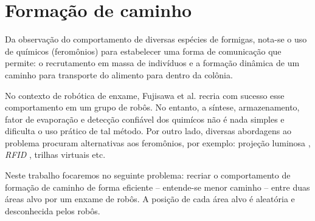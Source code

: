 \section{Formação de caminho}

Da observação do comportamento de diversas espécies de formigas, nota-se o uso de químicos (feromônios) para estabelecer uma forma de comunicação que permite: o recrutamento em massa de indivíduos e a formação dinâmica de um caminho para transporte do alimento para dentro da colônia.

No contexto de robótica de enxame, Fujisawa et al. \cite{fujisawa2008pheromone} recria com sucesso esse comportamento em um grupo de robôs. No entanto, a síntese, armazenamento, fator de evaporação e detecção confiável dos quimícos não é nada simples e dificulta o uso prático de tal método.
Por outro lado, diversas abordagens ao problema procuram alternativas aos feromônios, por exemplo: projeção luminosa \cite{garnier2007alice}, \textit{RFID} \cite{mamei2007rfid}, trilhas virtuais \cite{payton2001pheromone} etc.

Neste trabalho focaremos no seguinte problema: recriar o comportamento de formação de caminho de forma eficiente -- entende-se menor caminho -- entre duas áreas alvo por um enxame de robôs. A posição de cada área alvo é aleatória e desconhecida pelos robôs.
